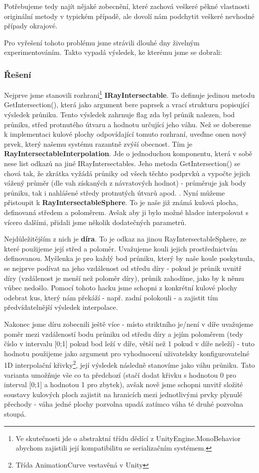 Potřebujeme tedy najít nějaké zobecnění, které zachová veškeré pěkné vlastnosti originální metody v typickém případě, ale dovolí nám podchytit veškeré nevhodné případy okrajové.

Pro vyřešení tohoto problému jsme strávili dlouhé dny živelným experimentováním. Takto vypadá výsledek, ke kterému jsme se dobrali:

\subsubsection*{Řešení}

Nejprve jsme stanovili rozhraní\footnote{Ve skutečnosti jde o abstraktní třídu dědící z UnityEngine.MonoBehavior abychom zajistili její kompatibilitu se serializačním systémem.} \textbf{IRayIntersectable}. To definuje jedinou metodu GetIntersection(), která jako argument bere paprsek a vrací strukturu popisující výsledek průniku. Tento výsledek zahrnuje flag zda byl průnik nalezen, bod průniku, střed protnutého útvaru a hodnotu určující jeho váhu.
\bigbreak
Než se dobereme k implementaci kulové plochy odpovídající tomuto rozhraní, uveďme onen nový prvek, který našemu systému razantně zvýší obecnost. Tím je \textbf{RayIntersectableInterpolation}. Jde o jednoduchou komponentu, která v sobě nese list odkazů na jiné IRayIntersectables. Jeho metoda GetIntersection() se chová tak, že zkrátka vyžádá průniky od všech těchto podprvků a vypočte jejich vážený průměr (dle vah získaných z návratových hodnot) - průměruje jak body průniku, tak i nahlášené středy protnutých útvarů apod. .
\bigbreak
Nyní můžeme přistoupit k \textbf{RayIntersectableSphere}. To je naše již známá kulová plocha, definovaná středem a poloměrem. Avšak aby ji bylo možné hladce interpolovat s vícero dalšími, přidali jsme několik dodatečných parametrů.

Nejdůležitějším z nich je \textbf{díra}. To je odkaz na jinou RayIntersectableSphere, ze které použijeme její střed a poloměr. Uvažujeme kouli jejich prostřednictvím definovanou. Myšlenka je pro každý bod průniku, který by naše koule poskytnula, se nejprve podívat na jeho vzdálenost od středu díry - pokud je průnik uvnitř díry (vzdálenost je menší než poloměr díry), průnik zahodíme, jako by k němu vůbec nedošlo. Pomocí tohoto hacku jsme schopni z konkrétní kulové plochy odebrat kus, který nám překáží - např. zadní polokouli - a zajistit tím předvídatelnější výsledek interpolace.

Nakonec jsme díru zobecnili ještě více - místo striktního je/není v díře uvažujeme poměr mezi vzdáleností bodu průniku od středu díry a jejím poloměrem (tedy číslo v intervalu [0;1] pokud bod leží v díře, větší než 1 pokud v díře neleží) - tuto hodnotu použijeme jako argument pro vyhodnocení uživatelsky konfigurovatelné 1D interpolační křivky\footnote{Třída AnimationCurve vestavěná v Unity}, její výsledek následně stanovíme jako váhu průniku. Tato varianta umožňuje vše co ta předchozí (stačí dodat křivku s hodnotou 0 pro interval [0;1] a hodnotou 1 pro zbytek), avšak nově jsme schopni unvitř složité soustavy kulových ploch zajistit na hranicích mezi jednotlivými prvky plynulé přechody - váha jedné plochy pozvolna upadá zatímco váha té druhé pozvolna stoupá.

